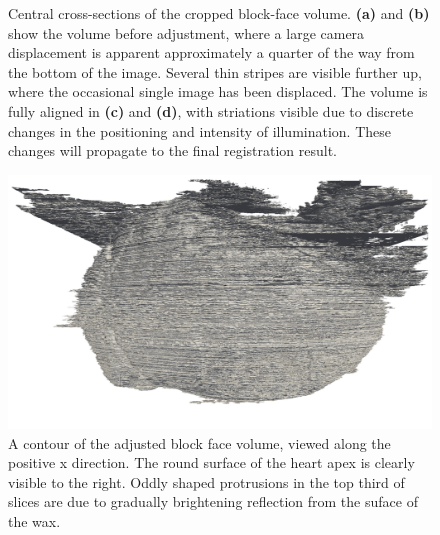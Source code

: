 \begin{figure}
      \caption{Central cross-sections of the cropped block-face volume. \textbf{(a)} and \textbf{(b)} show the volume before adjustment, where a large camera displacement is apparent approximately a quarter of the way from the bottom of the image. Several thin stripes are visible further up, where the occasional single image has been displaced. The volume is fully aligned in \textbf{(c)} and \textbf{(d)}, with striations visible due to discrete changes in the positioning and intensity of illumination. These changes will propagate to the final registration result.}
      \label{fig:LoRes_cross_sections}
    \end{figure}
    
    \begin{figure}
      \centering
      \includegraphics[width=\textheight]{Ch6/Figs/Rat28/contours/LoRes_positive_x}
      \caption{A contour of the adjusted block face volume, viewed along the positive x direction. The round surface of the heart apex is clearly visible to the right. Oddly shaped protrusions in the top third of slices are due to gradually brightening reflection from the suface of the wax.}
      \label{fig:LoRes_positive_x}
    \end{figure}
    
